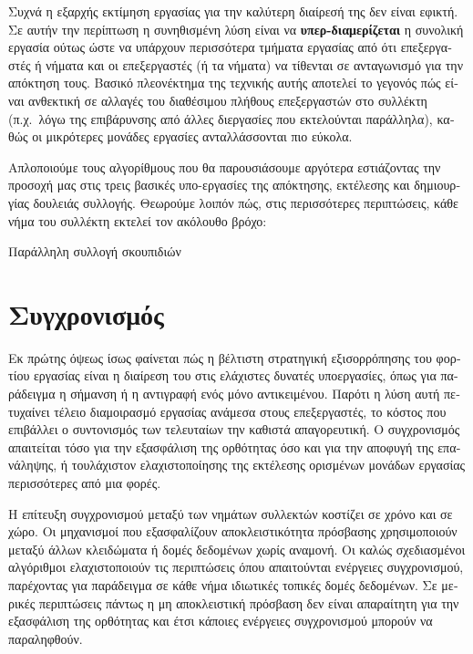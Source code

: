 \begin{greek}
Συχνά η εξαρχής εκτίμηση εργασίας για την καλύτερη διαίρεσή της
δεν είναι εφικτή. Σε αυτήν την περίπτωση η συνηθισμένη λύση
είναι να \textbf{υπερ-διαμερίζεται} η συνολική εργασία ούτως
ώστε να υπάρχουν περισσότερα τμήματα εργασίας από ότι επεξεργαστές
ή νήματα και οι επεξεργαστές (ή τα νήματα) να τίθενται σε
ανταγωνισμό για την απόκτηση τους. Βασικό πλεονέκτημα της τεχνικής
αυτής αποτελεί το γεγονός πώς είναι ανθεκτική σε αλλαγές του
διαθέσιμου πλήθους επεξεργαστών στο συλλέκτη (π.χ.\ λόγω της
επιβάρυνσης από άλλες διεργασίες που εκτελούνται παράλληλα), καθώς
οι μικρότερες μονάδες εργασίες ανταλλάσσονται πιο εύκολα.

Απλοποιούμε τους αλγορίθμους που θα παρουσιάσουμε αργότερα εστιάζοντας
την προσοχή μας στις τρεις βασικές υπο-εργασίες της απόκτησης,
εκτέλεσης και δημιουργίας δουλειάς συλλογής. Θεωρούμε λοιπόν πώς,
στις περισσότερες περιπτώσεις, κάθε νήμα του συλλέκτη εκτελεί
τον ακόλουθο βρόχο:

\begin{algorithm}
  \caption{Παράλληλη συλλογή σκουπιδιών}
  \label{alg:par_1}
  \begin{algorithmic}[1]
        \State {}
        \State {}
        \State {}
      \EndWhile
    \EndProcedure
  \end{algorithmic}
\end{algorithm}

\section{Συγχρονισμός}
Εκ πρώτης όψεως ίσως φαίνεται πώς η βέλτιστη στρατηγική
εξισορρόπησης του φορτίου εργασίας είναι η διαίρεση του στις
ελάχιστες δυνατές υποεργασίες, όπως για παράδειγμα η σήμανση
ή η αντιγραφή ενός μόνο αντικειμένου. Παρότι η λύση αυτή πετυχαίνει
τέλειο διαμοιρασμό εργασίας ανάμεσα στους επεξεργαστές, το
κόστος που επιβάλλει ο συντονισμός των τελευταίων την καθιστά
απαγορευτική. Ο συγχρονισμός απαιτείται τόσο για την εξασφάλιση
της ορθότητας όσο και για την αποφυγή της επανάληψης, ή
τουλάχιστον ελαχιστοποίησης της εκτέλεσης ορισμένων μονάδων
εργασίας περισσότερες από μια φορές.

Η επίτευξη συγχρονισμού μεταξύ των νημάτων συλλεκτών κοστίζει
σε χρόνο και σε χώρο. Οι μηχανισμοί που εξασφαλίζουν αποκλειστικότητα
πρόσβασης χρησιμοποιούν μεταξύ άλλων κλειδώματα ή δομές
δεδομένων χωρίς αναμονή. Οι καλώς σχεδιασμένοι αλγόριθμοι
ελαχιστοποιούν τις περιπτώσεις όπου απαιτούνται ενέργειες
συγχρονισμού, παρέχοντας για παράδειγμα σε κάθε νήμα ιδιωτικές
τοπικές δομές δεδομένων. Σε μερικές περιπτώσεις πάντως η
μη αποκλειστική πρόσβαση δεν είναι απαραίτητη για την εξασφάλιση
της ορθότητας και έτσι κάποιες ενέργειες συγχρονισμού μπορούν
να παραληφθούν.


\end{greek}
